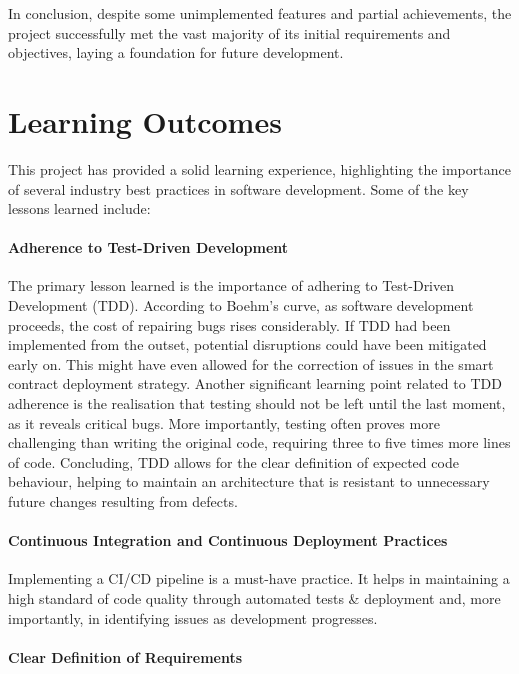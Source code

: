 In conclusion, despite some unimplemented features and partial achievements, the project successfully met the vast majority of its initial requirements and objectives, laying a foundation for future development.

\section{Learning Outcomes}

This project has provided a solid learning experience, highlighting the importance of several industry best practices in software development. Some of the key lessons learned include:

\paragraph{Adherence to Test-Driven Development}

The primary lesson learned is the importance of adhering to Test-Driven Development (TDD). According to Boehm's curve, as software development proceeds, the cost of repairing bugs rises considerably. If TDD had been implemented from the outset, potential disruptions could have been mitigated early on. This might have even allowed for the correction of issues in the smart contract deployment strategy. Another significant learning point related to TDD adherence is the realisation that testing should not be left until the last moment, as it reveals critical bugs. More importantly, testing often proves more challenging than writing the original code, requiring three to five times more lines of code. Concluding, TDD allows for the clear definition of expected code behaviour, helping to maintain an architecture that is resistant to unnecessary future changes resulting from defects.

\paragraph{Continuous Integration and Continuous Deployment Practices}

Implementing a CI/CD pipeline is a must-have practice. It helps in maintaining a high standard of code quality through automated tests \& deployment and, more importantly, in identifying issues as development progresses. 

\paragraph{Clear Definition of Requirements}

